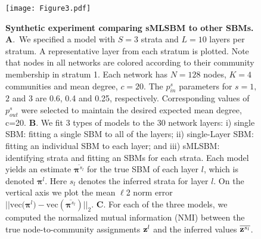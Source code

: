{\begin{figure}
\begin{center}
\texttt{[image: Figure3.pdf]}
\caption{{\bf \noindent Synthetic experiment comparing sMLSBM to other SBMs.} 
%
{\bf A}.~We specified a model with $S=3$ strata and $L=10$ layers per stratum. A representative layer from each stratum is plotted. Note that nodes in all networks are colored according to their community membership in stratum 1. Each network has $N=128$ nodes, $K=4$ communities and mean degree, $c=20$. The $p_{in}^s$ parameters for $s=1,$ $2$ and 3 are 0.6, 0.4 and 0.25, respectively. Corresponding values of $p_{out}^s$ were selected to maintain the desired expected mean degree, c=20. 
%
{\bf B}. We fit 3 types of models to the 30 network layers:
i) single SBM: fitting a single SBM to all of the layers;
ii) single-Layer SBM: fitting an individual SBM to each layer; and
iii) sMLSBM: identifying strata and fitting an SBMs for each strata. 
Each model yields an estimate $\overline{{\boldsymbol \pi}^{s_l}}$ for the true SBM of each layer $l$, which is denoted ${{\boldsymbol \pi}}^{l}$. Here $s_l$ denotes the inferred strata for layer $l$.
On the vertical axis we plot the mean $\ell$2 norm error 
$||\text{vec}({\boldsymbol \pi^{l})}-\text{vec}(\overline{{\boldsymbol \pi}^{s_{l}}})||_{2}$. 
 {\bf C}. For each of the three models, we computed the normalized mutual information (NMI) between the true node-to-community assignments ${{\bf z}^{l}}$ and the inferred values $\overline{{\bf z}^{s_l}}$.}
 \label{fig:SynExp1}
\end{center}
\end{figure} 

}
